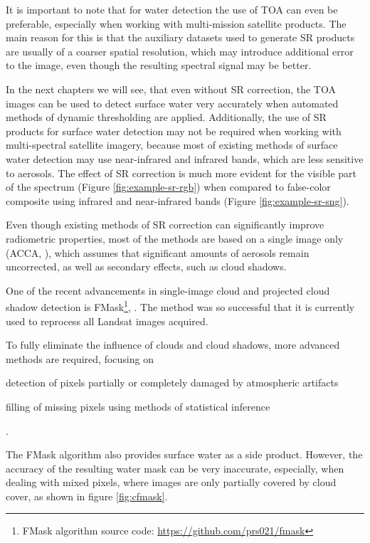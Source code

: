 It is important to note that for water detection the use of TOA can even be preferable, especially when working with multi-mission satellite products. The main reason for this is that the auxiliary datasets used to generate SR products are usually of a coarser spatial resolution, which may introduce additional error to the image, even though the resulting spectral signal may be better. 

In the next chapters we will see, that even without SR correction, the TOA images can be used to detect surface water very accurately when automated methods of dynamic thresholding are applied. Additionally, the use of SR products for surface water detection may not be required when working with multi-spectral satellite imagery, because most of existing methods of surface water detection may use near-infrared and infrared bands, which are less sensitive to aerosols. The effect of SR correction is much more evident for the visible part of the spectrum (Figure \ref{fig:example-sr-rgb}) when compared to false-color composite using infrared and near-infrared bands (Figure \ref{fig:example-sr-sng}).

Even though existing methods of SR correction can significantly improve radiometric properties, most of the methods are based on a single image only (ACCA, \citet{irish2006characterization}), which assumes that significant amounts of aerosols remain uncorrected, as well as secondary effects, such as cloud shadows.

One of the recent advancements in single-image cloud and projected cloud shadow detection is FMask\footnote{FMask algorithm source code: \url{https://github.com/prs021/fmask}}, \citet{zhu2012object, zhu2015improvement}. The method was so successful that it is currently used to reprocess all Landsat images acquired. 

To fully eliminate the influence of clouds and cloud shadows, more advanced methods are required, focusing on \begin{enumerate*}[label=(\emph{\alph*})]
	\item detection of pixels partially or completely damaged by atmospheric artifacts
	\item filling of missing pixels using methods of statistical inference
\end{enumerate*}. 

The FMask algorithm also provides surface water as a side product. However, the accuracy of the resulting water mask can be very inaccurate, especially, when dealing with mixed pixels, where images are only partially covered by cloud cover, as shown in figure \ref{fig:cfmask}.

